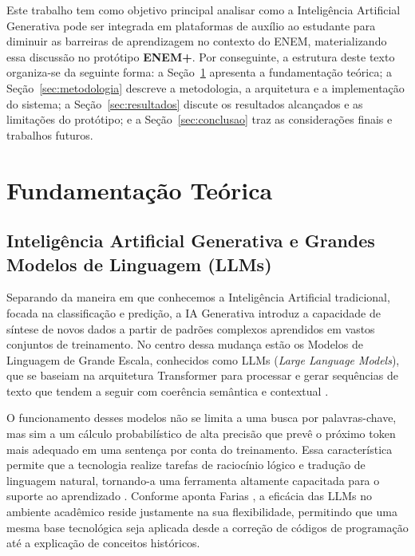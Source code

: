 \documentclass[12pt]{article}
\begin{document}
Este trabalho tem como objetivo principal analisar como a Inteligência Artificial Generativa pode ser integrada em plataformas de auxílio ao estudante para diminuir as barreiras de aprendizagem no contexto do ENEM, materializando essa discussão no protótipo \textbf{ENEM+}. Por conseguinte, a estrutura deste texto organiza-se da seguinte forma: a Seção~\ref{sec:fundamentacao} apresenta a fundamentação teórica; a Seção~\ref{sec:metodologia} descreve a metodologia, a arquitetura e a implementação do sistema; a Seção~\ref{sec:resultados} discute os resultados alcançados e as limitações do protótipo; e a Seção~\ref{sec:conclusao} traz as considerações finais e trabalhos futuros.

\section{Fundamentação Teórica}
\label{sec:fundamentacao}

\subsection{Inteligência Artificial Generativa e Grandes Modelos de Linguagem (LLMs)}

Separando da maneira em que conhecemos a Inteligência Artificial tradicional, focada na classificação e predição, a IA Generativa introduz a capacidade de síntese de novos dados a partir de padrões complexos aprendidos em vastos conjuntos de treinamento. No centro dessa mudança estão os Modelos de Linguagem de Grande Escala, conhecidos como LLMs (\textit{Large Language Models}), que se baseiam na arquitetura Transformer para processar e gerar sequências de texto que tendem a seguir com coerência semântica e contextual \cite{lo2023}.

O funcionamento desses modelos não se limita a uma busca por palavras-chave, mas sim a um cálculo probabilístico de alta precisão que prevê o próximo token mais adequado em uma sentença por conta do treinamento. Essa característica permite que a tecnologia realize tarefas de raciocínio lógico e tradução de linguagem natural, tornando-a uma ferramenta altamente capacitada para o suporte ao aprendizado \cite{kasneci2023}. Conforme aponta Farias \cite{sbc2024}, a eficácia das LLMs no ambiente acadêmico reside justamente na sua flexibilidade, permitindo que uma mesma base tecnológica seja aplicada desde a correção de códigos de programação até a explicação de conceitos históricos.
\end{document}
